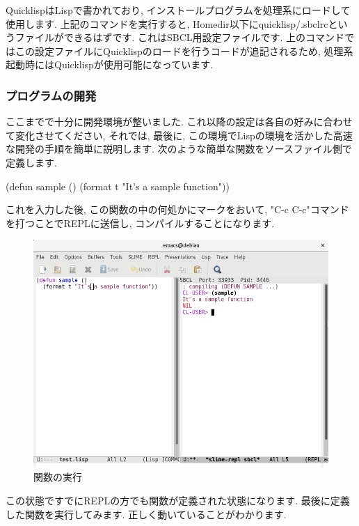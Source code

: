 \documentclass[mingoth,a4paper]{jsarticle}
\begin{document}
QuicklispはLispで書かれており, インストールプログラムを処理系にロードして使用します. 上記のコマンドを実行すると, Homedir以下にquicklisp/.sbclrcというファイルができるはずです. これはSBCL用設定ファイルです. 上のコマンドではこの設定ファイルにQuicklispのロードを行うコードが追記されるため, 処理系起動時にはQuicklispが使用可能になっています. 

\subsubsection{プログラムの開発}
ここまでで十分に開発環境が整いました. これ以降の設定は各自の好みに合わせて変化させてください, それでは, 最後に, この環境でLispの環境を活かした高速な開発の手順を簡単に説明します. 
次のような簡単な関数をソースファイル側で定義します. 

\begin{commandline}
(defun sample ()
	(format t "It's a sample function"))
\end{commandline}

これを入力した後, この関数の中の何処かにマークをおいて, "C-c C-c"コマンドを打つことでREPLに送信し, コンパイルすることになります. 

\begin{figure}[htbp!]
\centering
\includegraphics[scale=0.5]{image201709-kansai/do.png}
\caption{関数の実行}
\end{figure}

この状態ですでにREPLの方でも関数が定義された状態になります. 
最後に定義した関数を実行してみます. 
正しく動いていることがわかります. 
\end{document}
